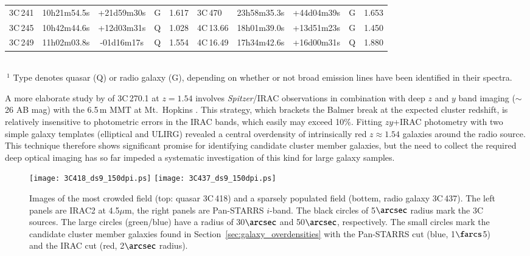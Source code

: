\documentclass[mathleft,fleqn,%
]{an}
\begin{document}
\begin{table*}
\begin{tabular}{lcccc|lcccc}
 3C\,241      & 10h21m54.5s  & +21d59m30s  &   G  &   1.617   &   3C\,470      & 23h58m35.3s  & +44d04m39s  &   G  &   1.653  \\
 3C\,245      & 10h42m44.6s  & +12d03m31s  &   Q  &   1.028   &   4C\,13.66    & 18h01m39.0s  & +13d51m23s  &   G  &   1.450  \\
 3C\,249      & 11h02m03.8s  & -01d16m17s  &   Q  &   1.554   &   4C\,16.49    & 17h34m42.6s  & +16d00m31s  &   Q  &   1.880  \\
\hline
\end{tabular}
~\\
$~^1$ Type denotes quasar (Q) or radio galaxy (G), depending on
whether or not broad emission lines have been identified in their spectra.
\end{table*}

A more elaborate study by \citet{Haas09} of 3C\,270.1 at $z=1.54$
involves {\it Spitzer}/IRAC 
observations in combination with deep $z$ and $y$ band imaging 
($\sim$26 AB
mag) with the 6.5\,m MMT at Mt.\ Hopkins 
\citep{McLeod06, Brown08}. 
This strategy, which brackets the Balmer break at the expected cluster
redshift, is relatively insensitive to photometric errors in the IRAC
bands, which 
easily may exceed 10\%.
Fitting $zy$+IRAC photometry with two simple galaxy
templates (elliptical and ULIRG)
revealed
a central overdensity of intrinsically 
red $z \approx 1.54$ galaxies around the
radio source. 
This technique therefore shows significant promise for identifying 
candidate cluster member galaxies, %
but the need to collect the required deep
optical imaging has so far impeded a systematic investigation of this kind 
for large galaxy samples. 

\begin{figure*}
  \texttt{[image: 3C418\_ds9\_150dpi.ps]}
  \texttt{[image: 3C437\_ds9\_150dpi.ps]}
  \caption{
   Images of the most crowded field (top: quasar 3C\,418) and a sparsely populated
   field (bottem, radio galaxy 3C\,437). 
   The left panels are IRAC2 at 4.5$\mu$m, the right panels are Pan-STARRS $i$-band.
   The black circles of 5$\arcsec$ radius mark the 3C sources.
   The large circles (green/blue) have a radius of 30$\arcsec$ and 50$\arcsec$, respectively.
   The small circles mark the candidate cluster member galaxies 
   found in Section~\ref{sec:galaxy_overdensities} with the Pan-STARRS cut
   (blue, 1$\farcs$5) and the IRAC cut (red, 2$\arcsec$ radius).
  }
  \label{fig_images}
\end{figure*}
\end{document}
